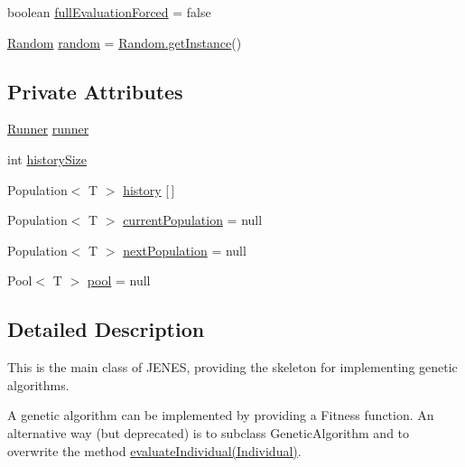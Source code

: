 \begin{DoxyCompactItemize}
\item 
boolean \hyperlink{classjenes_1_1_genetic_algorithm_3_01_t_01extends_01_chromosome_01_4_adb627d0c6d6744f53ef5c3b7506913e9}{full\-Evaluation\-Forced} = false
\item 
\hyperlink{classjenes_1_1utils_1_1_random}{Random} \hyperlink{classjenes_1_1_genetic_algorithm_3_01_t_01extends_01_chromosome_01_4_a1579283e210144ba90b937be0911a028}{random} = \hyperlink{classjenes_1_1utils_1_1_random_aa8b8341f82ccf69de0b44c9f6f174820}{Random.\-get\-Instance}()
\end{DoxyCompactItemize}
\subsection*{Private Attributes}
\begin{DoxyCompactItemize}
\item 
\hyperlink{classjenes_1_1utils_1_1multitasking_1_1_runner}{Runner} \hyperlink{classjenes_1_1_genetic_algorithm_3_01_t_01extends_01_chromosome_01_4_a9d6056090be623c86c46ad62d37ff164}{runner}
\item 
int \hyperlink{classjenes_1_1_genetic_algorithm_3_01_t_01extends_01_chromosome_01_4_a19813646965d357e4e3526fe6b64a0a4}{history\-Size}
\item 
Population$<$ T $>$ \hyperlink{classjenes_1_1_genetic_algorithm_3_01_t_01extends_01_chromosome_01_4_a4213a84e54e3d515be8824b4e5c4a70e}{history} \mbox{[}$\,$\mbox{]}
\item 
Population$<$ T $>$ \hyperlink{classjenes_1_1_genetic_algorithm_3_01_t_01extends_01_chromosome_01_4_a13cd44ba0fe337e32a545fa925f570c7}{current\-Population} = null
\item 
Population$<$ T $>$ \hyperlink{classjenes_1_1_genetic_algorithm_3_01_t_01extends_01_chromosome_01_4_a7d361b32fc05b1ad9b2f84b2f8b4a6aa}{next\-Population} = null
\item 
Pool$<$ T $>$ \hyperlink{classjenes_1_1_genetic_algorithm_3_01_t_01extends_01_chromosome_01_4_a355d3311ff5b27ae057c3dd06c75e7cd}{pool} = null
\end{DoxyCompactItemize}


\subsection{Detailed Description}
This is the main class of J\-E\-N\-E\-S, providing the skeleton for implementing genetic algorithms. 

A genetic algorithm can be implemented by providing a {\ttfamily Fitness} function. An alternative way (but deprecated) is to subclass {\ttfamily Genetic\-Algorithm} and to overwrite the method \hyperlink{}{evaluate\-Individual(\-Individual)}. 

